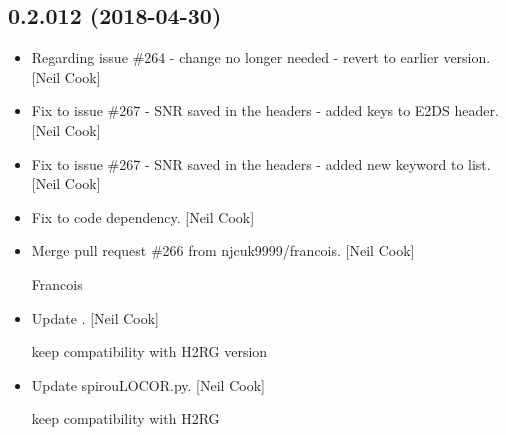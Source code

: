 \documentclass[a4paper,10pt,english]{report}
\begin{document}
\subsection{0.2.012 (2018-04-30)}
\label{\detokenize{misc/changelog:id448}}\begin{itemize}
\item {} 
Regarding issue \#264 - change no longer needed - revert to earlier
version. {[}Neil Cook{]}

\item {} 
Fix to issue \#267 - SNR saved in the headers - added keys to E2DS
header. {[}Neil Cook{]}

\item {} 
Fix to issue \#267 - SNR saved in the headers - added new keyword to
list. {[}Neil Cook{]}

\item {} 
Fix to code dependency. {[}Neil Cook{]}

\item {} 
Merge pull request \#266 from njcuk9999/francois. {[}Neil Cook{]}

Francois

\item {} 
Update . {[}Neil Cook{]}

keep compatibility with H2RG version

\item {} 
Update spirouLOCOR.py. {[}Neil Cook{]}

keep compatibility with H2RG

\end{itemize}
\end{document}
